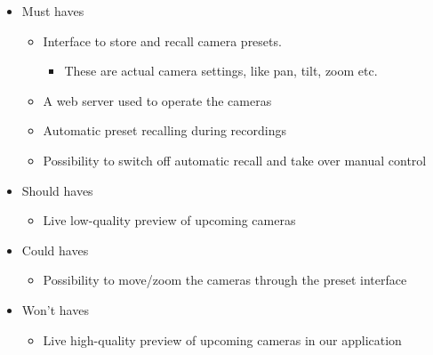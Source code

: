 \begin{itemize}
\item Must haves
\begin{itemize}
\item Interface to store and recall camera presets.
\begin{itemize}
\item These are actual camera settings, like pan, tilt, zoom etc.
\end{itemize}
\item A web server used to operate the cameras
\item Automatic preset recalling during recordings
\item Possibility to switch off automatic recall and take over manual control
\end{itemize}
\item Should haves
\begin{itemize}
\item Live low-quality preview of upcoming cameras
\end{itemize}
\item Could haves
\begin{itemize}
\item Possibility to move/zoom the cameras through the preset interface
\end{itemize}
\item Won't haves
\begin{itemize}
\item Live high-quality preview of upcoming cameras in our application
\end{itemize}
\end{itemize}